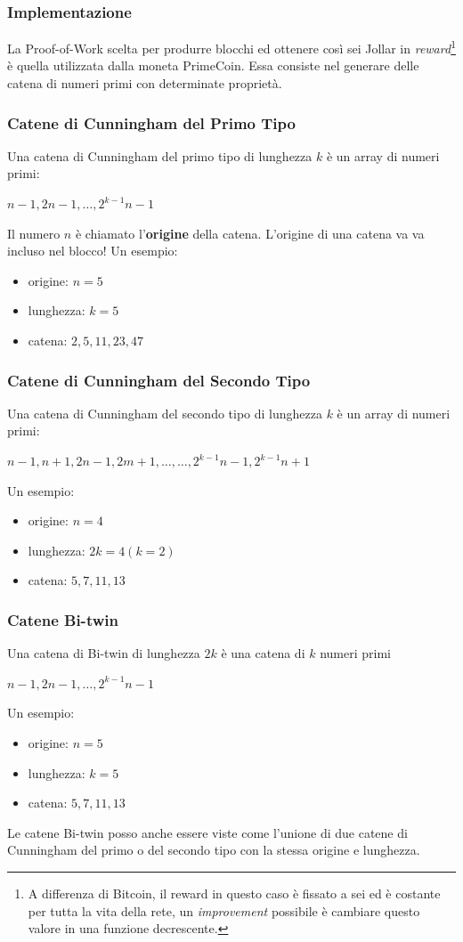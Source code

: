 \subsubsection{Implementazione}
La Proof-of-Work scelta per produrre blocchi ed ottenere così sei Jollar in \textit{reward}\footnote{A differenza di Bitcoin, il reward in questo caso è fissato a sei ed è costante per tutta la vita della rete, un \textit{improvement} possibile è cambiare questo valore in una funzione decrescente.} è quella utilizzata dalla moneta PrimeCoin. Essa consiste nel generare delle catena di numeri primi con determinate proprietà.

\subsubsection*{Catene di Cunningham del Primo Tipo}
Una catena di Cunningham del primo tipo di lunghezza $k$ è un array di numeri primi:
\begin{center}
    $n-1,2n-1,\dots,2^{k-1}n-1$
\end{center}
Il numero $n$ è chiamato l'\textbf{origine} della catena. L'origine di una catena va va incluso nel blocco! Un esempio:
\begin{itemize}
    \item origine: $n=5$
    \item lunghezza: $k=5$
    \item catena: $2,5,11,23,47$
\end{itemize}

\subsubsection*{Catene di Cunningham del Secondo Tipo}
Una catena di Cunningham del secondo tipo di lunghezza $k$ è un array di numeri primi:
\begin{center}
    $n-1,n+1,2n-1,2m+1,\dots,\dots,2^{k-1}n-1,2^{k-1}n+1$
\end{center}
Un esempio:
\begin{itemize}
    \item origine: $n=4$
    \item lunghezza: $2k=4(k=2)$
    \item catena: $5,7,11,13$
\end{itemize}

\subsubsection*{Catene Bi-twin}
Una catena di Bi-twin di lunghezza $2k$ è una catena di $k$ numeri primi
\begin{center}
    $n-1,2n-1,\dots,2^{k-1}n-1$
\end{center}
 Un esempio:
\begin{itemize}
    \item origine: $n=5$
    \item lunghezza: $k=5$
    \item catena: $5,7,11,13$
\end{itemize}
Le catene Bi-twin posso anche essere viste come l'unione di due catene di Cunningham del primo o del secondo tipo con la stessa origine e lunghezza.
%
